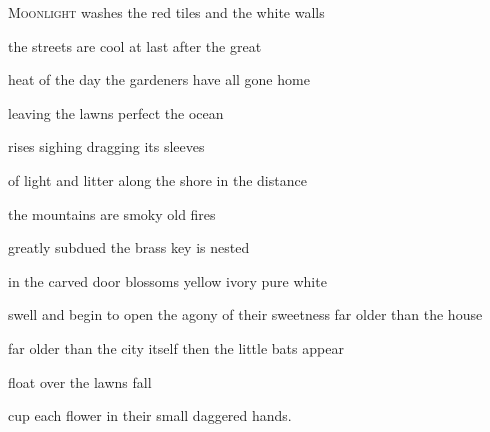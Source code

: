 
\begin{poem}
\begin{stanza}
\textsc{Moonlight} \verseline
washes the red tiles\verseline
and the white walls
\end{stanza}

\begin{stanza}
the streets\verseline
are cool at last\verseline
after the great
\end{stanza}

\begin{stanza}
heat of the day\verseline
the gardeners\verseline
have all gone home
\end{stanza}

\begin{stanza}
leaving the lawns\verseline
perfect\verseline
the ocean
\end{stanza}

\begin{stanza}
rises\verseline
sighing\verseline
dragging its sleeves
\end{stanza}

\begin{stanza}
of light and litter\verseline
along the shore\verseline
in the distance
\end{stanza}

\begin{stanza}
the mountains\verseline
are smoky\verseline
old fires
\end{stanza}

\begin{stanza}
greatly subdued\verseline
the brass key\verseline
is nested
\end{stanza}

\begin{stanza}
in the carved door\verseline
blossoms\verseline
yellow ivory pure white
\end{stanza}

\begin{stanza}
swell and begin to open\verseline
the agony of their sweetness\verseline
far older than the house
\end{stanza}

\begin{stanza}
far older than the city itself\verseline
then the little bats\verseline
appear
\end{stanza}

\begin{stanza}
float\verseline
over the lawns\verseline
fall
\end{stanza}

\begin{stanza}
cup each flower\verseline
in their small\verseline
daggered hands.
\end{stanza}
\end{poem}

\newpage %

